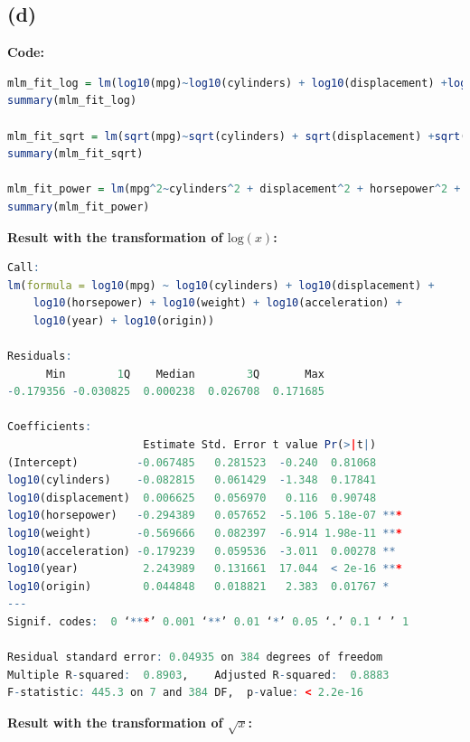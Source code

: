 \documentclass[twoside]{homework}
\begin{document}
\subsection*{(d)}
\textbf{Code:}
\begin{lstlisting}[language=R]
mlm_fit_log = lm(log10(mpg)~log10(cylinders) + log10(displacement) +log10(horsepower) + log10(weight) + log10(acceleration) + log10(year) + log10(origin))
summary(mlm_fit_log)

mlm_fit_sqrt = lm(sqrt(mpg)~sqrt(cylinders) + sqrt(displacement) +sqrt(horsepower) + sqrt(weight) + sqrt(acceleration) + sqrt(year) + sqrt(origin))
summary(mlm_fit_sqrt)

mlm_fit_power = lm(mpg^2~cylinders^2 + displacement^2 + horsepower^2 + weight^2 + acceleration^2 + year^2 + origin^2)
summary(mlm_fit_power)
\end{lstlisting}
\textbf{Result with the transformation of $\mathrm{log}(x)$:}
\begin{lstlisting}[language=R]
Call:
lm(formula = log10(mpg) ~ log10(cylinders) + log10(displacement) + 
    log10(horsepower) + log10(weight) + log10(acceleration) + 
    log10(year) + log10(origin))

Residuals:
      Min        1Q    Median        3Q       Max 
-0.179356 -0.030825  0.000238  0.026708  0.171685 

Coefficients:
                     Estimate Std. Error t value Pr(>|t|)    
(Intercept)         -0.067485   0.281523  -0.240  0.81068    
log10(cylinders)    -0.082815   0.061429  -1.348  0.17841    
log10(displacement)  0.006625   0.056970   0.116  0.90748    
log10(horsepower)   -0.294389   0.057652  -5.106 5.18e-07 ***
log10(weight)       -0.569666   0.082397  -6.914 1.98e-11 ***
log10(acceleration) -0.179239   0.059536  -3.011  0.00278 ** 
log10(year)          2.243989   0.131661  17.044  < 2e-16 ***
log10(origin)        0.044848   0.018821   2.383  0.01767 *  
---
Signif. codes:  0 ‘***’ 0.001 ‘**’ 0.01 ‘*’ 0.05 ‘.’ 0.1 ‘ ’ 1

Residual standard error: 0.04935 on 384 degrees of freedom
Multiple R-squared:  0.8903,	Adjusted R-squared:  0.8883 
F-statistic: 445.3 on 7 and 384 DF,  p-value: < 2.2e-16
\end{lstlisting}
\textbf{Result with the transformation of $\sqrt{x}$:}
\end{document}
